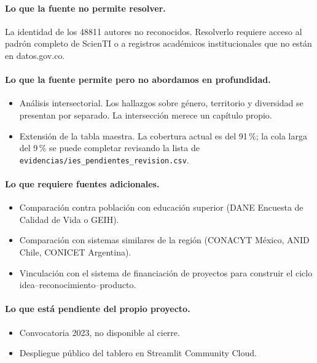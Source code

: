 \documentclass[11pt,a4paper,oneside]{article}
\begin{document}
\paragraph{Lo que la fuente no permite resolver.}
La identidad de los \num{48811} autores no reconocidos. Resolverlo requiere acceso al padrón completo de ScienTI o a registros académicos institucionales que no están en datos.gov.co.

\paragraph{Lo que la fuente permite pero no abordamos en profundidad.}
\begin{itemize}
\item Análisis intersectorial. Los hallazgos sobre género, territorio y diversidad se presentan por separado. La intersección merece un capítulo propio.
\item Extensión de la tabla maestra. La cobertura actual es del 91\,\%; la cola larga del 9\,\% se puede completar revisando la lista de \texttt{evidencias/ies\_pendientes\_revision.csv}.
\end{itemize}

\paragraph{Lo que requiere fuentes adicionales.}
\begin{itemize}
\item Comparación contra población con educación superior (DANE Encuesta de Calidad de Vida o GEIH).
\item Comparación con sistemas similares de la región (CONACYT México, ANID Chile, CONICET Argentina).
\item Vinculación con el sistema de financiación de proyectos para construir el ciclo idea--reconocimiento--producto.
\end{itemize}

\paragraph{Lo que está pendiente del propio proyecto.}
\begin{itemize}
\item Convocatoria 2023, no disponible al cierre.
\item Despliegue público del tablero en Streamlit Community Cloud.
\end{itemize}
\end{document}
